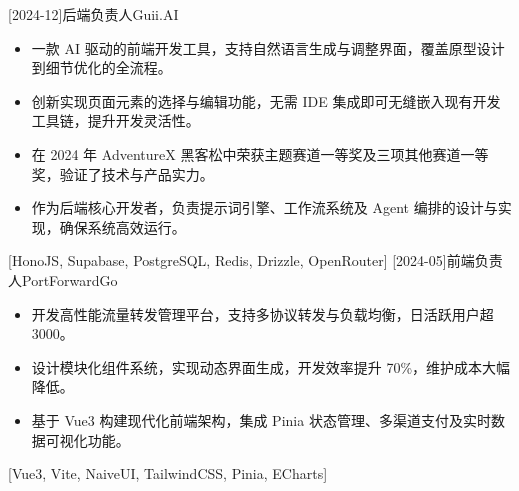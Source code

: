 \documentclass[zh]{resume}
\begin{document}
\begin{projects}
  [2024-12]{后端负责人}{}{Guii.AI}{
    \begin{itemize}
      \item 一款 AI 驱动的前端开发工具，支持自然语言生成与调整界面，覆盖原型设计到细节优化的全流程。
      \item 创新实现页面元素的选择与编辑功能，无需 IDE 集成即可无缝嵌入现有开发工具链，提升开发灵活性。
      \item 在 2024 年 AdventureX 黑客松中荣获主题赛道一等奖及三项其他赛道一等奖，验证了技术与产品实力。
      \item 作为后端核心开发者，负责提示词引擎、工作流系统及 Agent 编排的设计与实现，确保系统高效运行。
    \end{itemize}
  }[HonoJS, Supabase, PostgreSQL, Redis, Drizzle, OpenRouter]
  \separator{0.5ex}
  [2024-05]{前端负责人}{}{PortForwardGo}{
    \begin{itemize}
      \item 开发高性能流量转发管理平台，支持多协议转发与负载均衡，日活跃用户超 3000。
      \item 设计模块化组件系统，实现动态界面生成，开发效率提升 70\%，维护成本大幅降低。
      \item 基于 Vue3 构建现代化前端架构，集成 Pinia 状态管理、多渠道支付及实时数据可视化功能。
    \end{itemize}
  }[Vue3, Vite, NaiveUI, TailwindCSS, Pinia, ECharts]
\end{projects}
\end{document}
